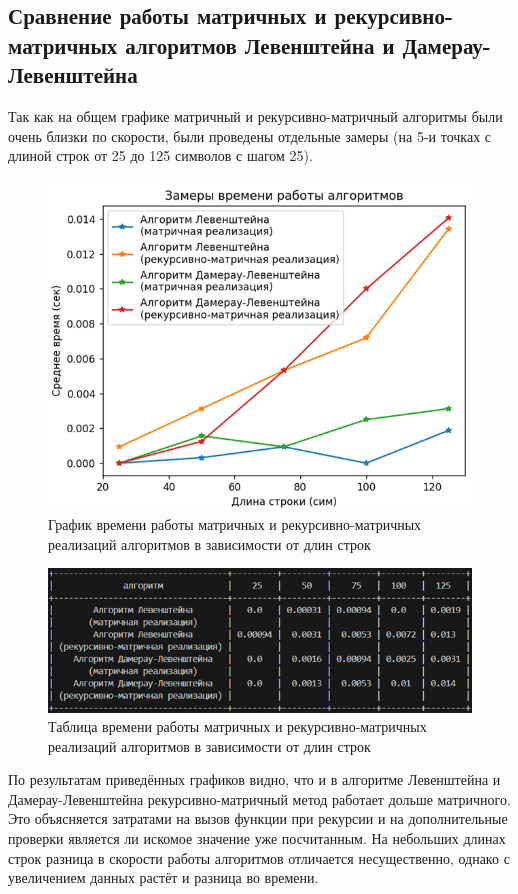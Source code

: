 \documentclass[a4paper,12pt]{article}
\begin{document}
\subsection{Сравнение работы матричных и рекурсивно-матричных алгоритмов Левенштейна и Дамерау-Левенштейна}
Так как на общем графике матричный и рекурсивно-матричный алгоритмы были очень близки по скорости, были проведены отдельные замеры (на 5-и точках с длиной строк от 25 до 125 символов с шагом 25).
\begin{figure}[H]
    \centering
    \includegraphics[width=1\textwidth]{graph_mat_rec-mat.png}
    \caption{График времени работы матричных и рекурсивно-матричных реализаций алгоритмов в зависимости от длин строк}
\end{figure}
\begin{figure}[H]
    \centering
    \includegraphics[width=1\textwidth]{table_mat_rec-mat.png}
    \caption{Таблица времени работы матричных и рекурсивно-матричных реализаций алгоритмов в зависимости от длин строк}
\end{figure}

По результатам приведённых графиков видно, что и в алгоритме Левенштейна и Дамерау-Левенштейна рекурсивно-матричный метод работает дольше матричного. Это объясняется затратами на вызов функции при рекурсии и на дополнительные проверки является ли искомое значение уже посчитанным. На небольших длинах строк разница в скорости работы алгоритмов отличается несущественно, однако с увеличением данных растёт и разница во времени.
\end{document}
